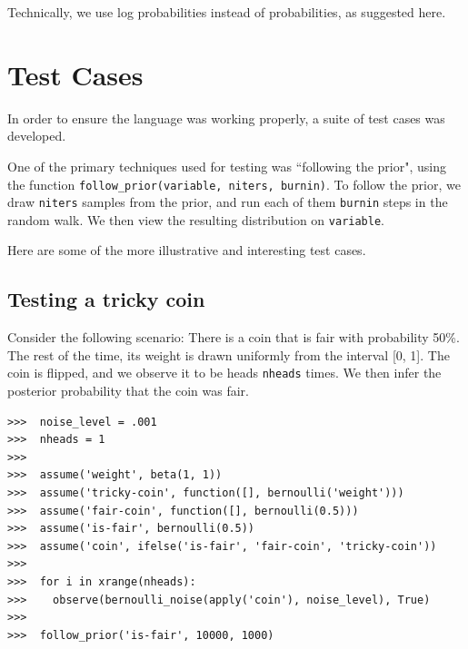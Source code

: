\documentclass[11pt]{article}
\begin{document}
Technically, we use log probabilities instead of probabilities, as suggested here.  







\pagebreak

\section{Test Cases}

In order to ensure the language was working properly, a suite of test cases was developed.  

One of the primary techniques used for testing was ``following the prior", using the function {\tt follow\_prior(variable, niters, burnin)}.  To follow the prior, we draw {\tt niters} samples from the prior, and run each of them {\tt burnin} steps in the random walk.  We then view the resulting distribution on {\tt variable}.  %

Here are some of the more illustrative and interesting test cases.


\subsection{Testing a tricky coin}

Consider the following scenario:  There is a coin that is fair with probability 50\%.  The rest of the time, its weight is drawn uniformly from the interval [0, 1].  The coin is flipped, and we observe it to be heads {\tt nheads} times.  We then infer the posterior probability that the coin was fair. 

\begin{small}
\begin{verbatim}
>>>  noise_level = .001
>>>  nheads = 1
>>>  
>>>  assume('weight', beta(1, 1))
>>>  assume('tricky-coin', function([], bernoulli('weight')))
>>>  assume('fair-coin', function([], bernoulli(0.5)))
>>>  assume('is-fair', bernoulli(0.5))
>>>  assume('coin', ifelse('is-fair', 'fair-coin', 'tricky-coin')) 
>>>
>>>  for i in xrange(nheads):
>>>    observe(bernoulli_noise(apply('coin'), noise_level), True)
>>>
>>>  follow_prior('is-fair', 10000, 1000)
\end{verbatim}
\end{small}
\end{document}

